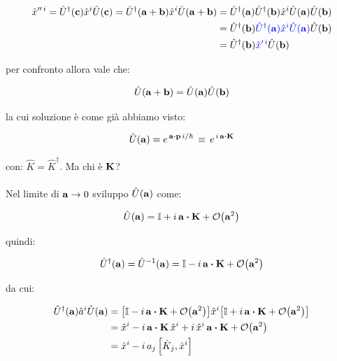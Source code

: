\begin{align*}
	\hat{x}''^{\,i} = \hat{U}^{\dagger}(\vb{c})\hat{x}^i\hat{U}(\vb{c}) = \hat{U}^{\dagger}(\vb{a} + \vb{b})\hat{x}^i\hat{U}(\vb{a} + \vb{b}) & =  \hat{U}^{\dagger}(\vb{a})\hat{U}^{\dagger}(\vb{b})\hat{x}^i\hat{U}(\vb{a})\hat{U}(\vb{b})  \\
	& = \hat{U}^{\dagger}(\vb{b})\textcolor{blue}{\hat{U}^{\dagger}(\vb{a})\hat{x}^i\hat{U}(\vb{a})}\hat{U}(\vb{b}) \\
	& = \hat{U}^{\dagger}(\vb{b})\textcolor{blue}{\hat{x}'^{\,i}}\hat{U}(\vb{b}) 
\end{align*}

	per confronto allora vale che:
	
\begin{align*}
	\hat{U}(\vb{a} + \vb{b}) = \hat{U}(\vb{a})\hat{U}(\vb{b})
\end{align*}
	
	la cui soluzione è come già abbiamo visto:
	
\begin{align*}
	\hat{U}(\vb{a}) = e^{\, \vb{a} \vdot \vb{p} \, i/\hbar} \, \equiv \, e^{ \, i \, \vb{a} \vdot \vb{K}}
\end{align*}

	con: $\hat{K} = \hat{K}^{\dagger}$. Ma chi è $\vb{K}$?
	\\
	\\
	Nel limite di $\vb{a} \to 0$ sviluppo $\hat{U}(\vb{a})$ come:
	
\begin{align*}
	\hat{U}(\vb{a}) = \mathbb{I} + i \, \vb{a} \vdot \vb{K} + \order{\vb{a}^2}
\end{align*}

	quindi:
	
\begin{align*}
	\hat{U}^{\dagger}(\vb{a}) = \hat{U}^{-1}(\vb{a}) = \mathbb{I} - i \, \vb{a} \vdot \vb{K} + \order{\vb{a}^2}
\end{align*}

	da cui:
	
\begin{align*}
	\hat{U}^{\dagger}(\vb{a}) \hat{a}^i\hat{U}(\vb{a}) &= \qty[\mathbb{I} - i \, \vb{a} \vdot \vb{K} + \order{\vb{a}^2} ]\hat{x}^i \qty[ \mathbb{I} + i \, \vb{a} \vdot \vb{K} + \order{\vb{a}^2}] \\
	& = \hat{x}^i - i\, \vb{a} \vdot \vb{K} \, \hat{x}^i + i \, \hat{x}^i \, \vb{a} \vdot \vb{K} + \order{\vb{a}^2} \\
	 & = \hat{x}^i - i \, a_j \, \qty[ \hat{K}_j, \hat{x}^i ]
\end{align*}

